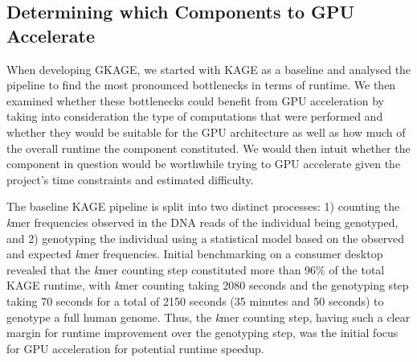 \subsection{Determining which Components to GPU Accelerate}

When developing GKAGE, we started with KAGE as a baseline and analysed the pipeline to find the most pronounced bottlenecks in terms of runtime.
We then examined whether these bottlenecks could benefit from GPU acceleration by taking into consideration the type of computations that were performed and whether they would be suitable for the GPU architecture as well as how much of the overall runtime the component constituted. 
We would then intuit whether the component in question would be worthwhile trying to GPU accelerate given the project's time constraints and estimated difficulty.

The baseline KAGE pipeline is split into two distinct processes: 1) counting the \textit{k}mer frequencies observed in the DNA reads of the individual being genotyped, and 2) genotyping the individual using a statistical model based on the observed and expected \textit{k}mer frequencies.
Initial benchmarking on a consumer desktop revealed that the \textit{k}mer counting step constituted more than 96\% of the total KAGE runtime, with \textit{k}mer counting taking 2080 seconds and the genotyping step taking 70 seconds for a total of 2150 seconds (35 minutes and 50 seconds) to genotype a full human genome.
Thus, the \textit{k}mer counting step, having such a clear margin for runtime improvement over the genotyping step, was the initial focus for GPU acceleration for potential runtime speedup.
